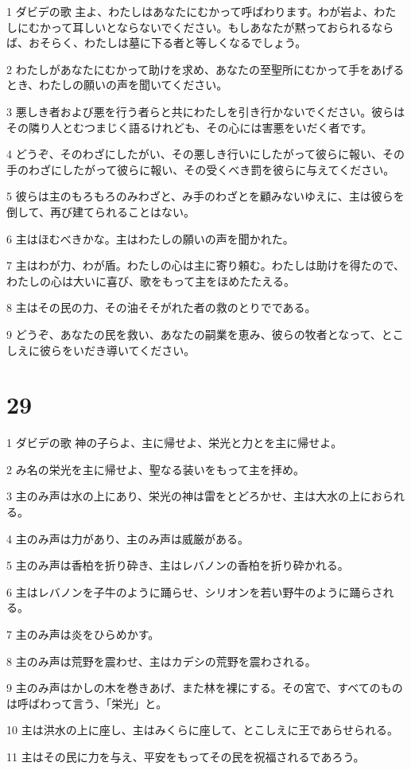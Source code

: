 \par 1 ダビデの歌 主よ、わたしはあなたにむかって呼ばわります。わが岩よ、わたしにむかって耳しいとならないでください。もしあなたが黙っておられるならば、おそらく、わたしは墓に下る者と等しくなるでしょう。
\par 2 わたしがあなたにむかって助けを求め、あなたの至聖所にむかって手をあげるとき、わたしの願いの声を聞いてください。
\par 3 悪しき者および悪を行う者らと共にわたしを引き行かないでください。彼らはその隣り人とむつまじく語るけれども、その心には害悪をいだく者です。
\par 4 どうぞ、そのわざにしたがい、その悪しき行いにしたがって彼らに報い、その手のわざにしたがって彼らに報い、その受くべき罰を彼らに与えてください。
\par 5 彼らは主のもろもろのみわざと、み手のわざとを顧みないゆえに、主は彼らを倒して、再び建てられることはない。
\par 6 主はほむべきかな。主はわたしの願いの声を聞かれた。
\par 7 主はわが力、わが盾。わたしの心は主に寄り頼む。わたしは助けを得たので、わたしの心は大いに喜び、歌をもって主をほめたたえる。
\par 8 主はその民の力、その油そそがれた者の救のとりでである。
\par 9 どうぞ、あなたの民を救い、あなたの嗣業を恵み、彼らの牧者となって、とこしえに彼らをいだき導いてください。

\chapter{29}

\par 1 ダビデの歌 神の子らよ、主に帰せよ、栄光と力とを主に帰せよ。
\par 2 み名の栄光を主に帰せよ、聖なる装いをもって主を拝め。
\par 3 主のみ声は水の上にあり、栄光の神は雷をとどろかせ、主は大水の上におられる。
\par 4 主のみ声は力があり、主のみ声は威厳がある。
\par 5 主のみ声は香柏を折り砕き、主はレバノンの香柏を折り砕かれる。
\par 6 主はレバノンを子牛のように踊らせ、シリオンを若い野牛のように踊らされる。
\par 7 主のみ声は炎をひらめかす。
\par 8 主のみ声は荒野を震わせ、主はカデシの荒野を震わされる。
\par 9 主のみ声はかしの木を巻きあげ、また林を裸にする。その宮で、すべてのものは呼ばわって言う、「栄光」と。
\par 10 主は洪水の上に座し、主はみくらに座して、とこしえに王であらせられる。
\par 11 主はその民に力を与え、平安をもってその民を祝福されるであろう。

